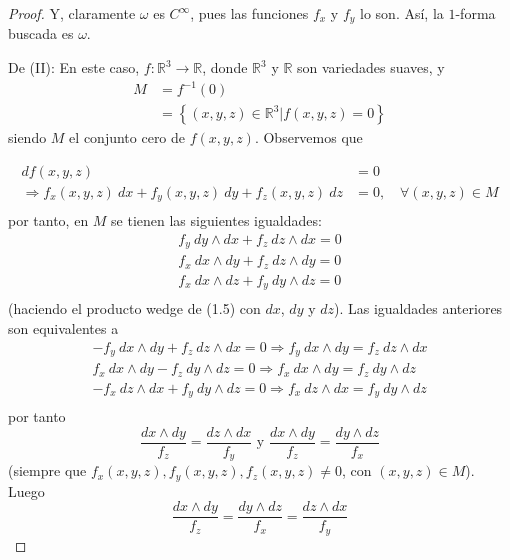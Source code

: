 \documentclass[12pt]{report}
\theoremstyle{largebreak}
\newcommand\cf[3]{\ensuremath{#1:#2\rightarrow#3}}
\begin{document}
\begin{proof}
        Y, claramente $\omega$ es $C^\infty$, pues las funciones $f_x$ y $f_y$ lo son. Así, la $1$-forma buscada es $\omega$.

        De (II): En este caso, $\cf{f}{\mathbb{R}^3}{\mathbb{R}}$, donde $\mathbb{R}^3$ y $\mathbb{R}$ son variedades suaves, y
        \begin{equation*}
            \begin{split}
                M&=f^{-1}(0)\\
                &=\left\{(x,y,z)\in\mathbb{R}^3|f(x,y,z)=0\right\}
            \end{split}
        \end{equation*}
        siendo $M$ el conjunto cero de $f(x,y,z)$. Observemos que

        \begin{equation}
            \begin{split}
                df(x,y,z)&=0\\
                \Rightarrow f_x(x,y,z)\:dx+f_y(x,y,z)\:dy+f_z(x,y,z)\:dz&=0,\quad\forall (x,y,z)\in M\\
            \end{split}
        \end{equation}
        por tanto, en $M$ se tienen las siguientes igualdades:
        \begin{equation*}
            \begin{split}
                f_y\:dy\wedge dx+f_z\:dz\wedge dx=0\\
                f_x\:dx\wedge dy+f_z\:dz\wedge dy=0\\
                f_x\:dx\wedge dz+f_y\:dy\wedge dz=0\\
            \end{split}
        \end{equation*}
        (haciendo el producto wedge de (1.5) con $dx$, $dy$ y $dz$). Las igualdades anteriores son equivalentes a
        \begin{equation*}
            \begin{split}
                -f_y\:dx\wedge dy+f_z\:dz\wedge dx=0\Rightarrow f_y\:dx\wedge dy=f_z\:dz\wedge dx \\
                f_x\:dx\wedge dy-f_z\:dy\wedge dz=0\Rightarrow f_x\:dx\wedge dy=f_z\:dy\wedge dz\\
                -f_x\:dz\wedge dx+f_y\:dy\wedge dz=0\Rightarrow f_x\:dz\wedge dx=f_y\:dy\wedge dz \\
            \end{split}
        \end{equation*}
        por tanto
        \begin{equation*}
            \frac{dx\wedge dy}{f_z}=\frac{dz\wedge dx}{f_y}\text{ y }\frac{dx\wedge dy}{f_z}=\frac{dy\wedge dz}{f_x}
        \end{equation*}
        (siempre que $f_x(x,y,z),f_y(x,y,z),f_z(x,y,z)\neq 0$, con $(x,y,z)\in M$). Luego
        \begin{equation}
            \frac{dx\wedge dy}{f_z}=\frac{dy\wedge dz}{f_x}=\frac{dz\wedge dx}{f_y}
        \end{equation}
        

\end{proof}
\end{document}

